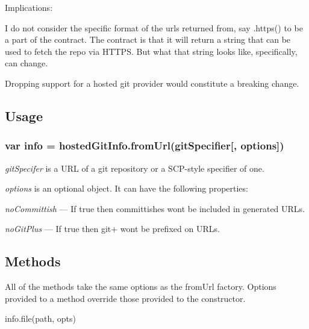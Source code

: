 Implications\+:


\begin{DoxyItemize}
\item I do not consider the specific format of the urls returned from, say {\ttfamily .https()} to be a part of the contract. The contract is that it will return a string that can be used to fetch the repo via H\+T\+T\+PS. But what that string looks like, specifically, can change.
\item Dropping support for a hosted git provider would constitute a breaking change.
\end{DoxyItemize}

\subsection*{Usage}

\subsubsection*{var info = hosted\+Git\+Info.\+from\+Url(git\+Specifier\mbox{[}, options\mbox{]})}


\begin{DoxyItemize}
\item {\itshape git\+Specifer} is a U\+RL of a git repository or a S\+C\+P-\/style specifier of one.
\item {\itshape options} is an optional object. It can have the following properties\+:
\begin{DoxyItemize}
\item {\itshape no\+Committish} — If true then committishes won\textquotesingle{}t be included in generated U\+R\+Ls.
\item {\itshape no\+Git\+Plus} — If true then {\ttfamily git+} won\textquotesingle{}t be prefixed on U\+R\+Ls.
\end{DoxyItemize}
\end{DoxyItemize}

\subsection*{Methods}

All of the methods take the same options as the {\ttfamily from\+Url} factory. Options provided to a method override those provided to the constructor.


\begin{DoxyItemize}
\item info.\+file(path, opts)
\end{DoxyItemize}


